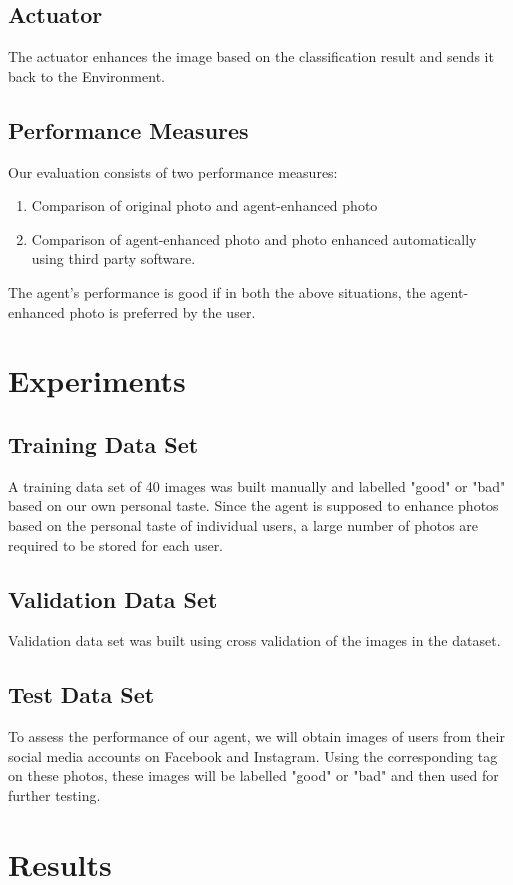 \documentclass[11pt, a4paper]{article}
\begin{document}
\subsection{Actuator}
The actuator enhances the image based on the classification result and sends it back to the Environment. 
\subsection{Performance Measures}
Our evaluation consists of two performance measures: 
\begin{enumerate}
  \item Comparison of original photo and agent-enhanced photo
  \item Comparison of agent-enhanced photo and photo enhanced automatically using third party software.
\end{enumerate}
The agent's performance is good if in both the above situations, the agent-enhanced photo is preferred by the user.
\section{Experiments}
\subsection{Training Data Set}
A training data set of 40 images was built manually and labelled "good" or "bad" based on our own personal taste. Since the agent is supposed to enhance photos based on the personal taste of individual users, a large number of photos are required to be stored for each user.
\subsection{Validation Data Set}
Validation data set was built using cross validation of the images in the dataset. 
\subsection{Test Data Set}
To assess the performance of our agent, we will obtain images of users from their social media accounts on Facebook and Instagram. Using the corresponding tag on these photos, these images will be labelled "good" or "bad" and then used for further testing.

\section{Results} 
\end{document}

